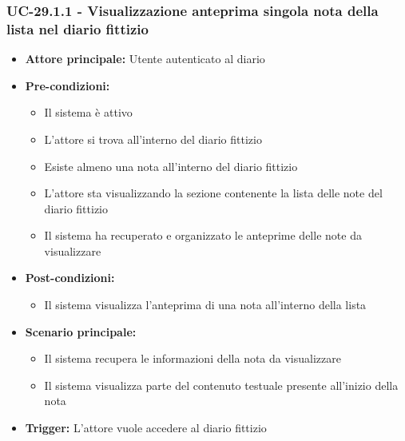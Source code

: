 \documentclass[a4paper,12pt]{article}
\begin{document}
\subsubsection{UC-29.1.1 - Visualizzazione anteprima singola nota della lista nel diario fittizio} \label{subsec:UC-29.1.1}
\begin{itemize}
    \item \textbf{Attore principale:} Utente autenticato al diario
    \item \textbf{Pre-condizioni:}
    \begin{itemize}
        \item Il sistema è attivo
        \item L'attore si trova all'interno del diario fittizio
        \item Esiste almeno una nota all'interno del diario fittizio
        \item L'attore sta visualizzando la sezione contenente la lista delle note del diario fittizio
        \item Il sistema ha recuperato e organizzato le anteprime delle note da visualizzare
    \end{itemize}
    \item \textbf{Post-condizioni:} 
    \begin{itemize}
        \item Il sistema visualizza l'anteprima di una nota all'interno della lista
    \end{itemize}
    \item \textbf{Scenario principale:} 
    \begin{itemize}
        \item Il sistema recupera le informazioni della nota da visualizzare
        \item Il sistema visualizza parte del contenuto testuale presente all'inizio della nota
    \end{itemize}
    \item \textbf{Trigger:} L'attore vuole accedere al diario fittizio
\end{itemize}
\end{document}
